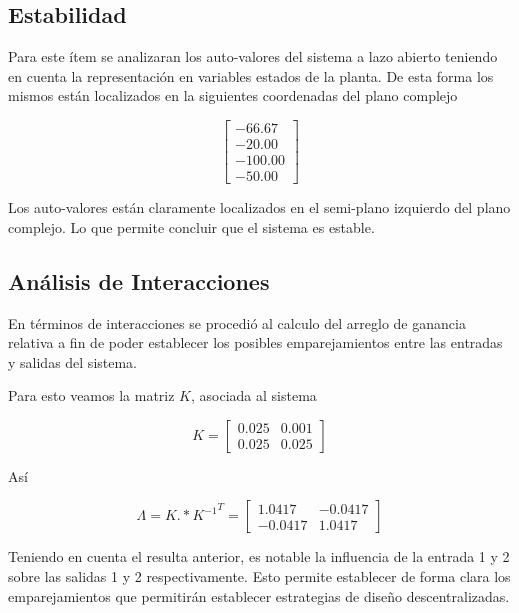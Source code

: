 \documentclass[journal,twoside,web]{ieeecolor}
\begin{document}
	\subsection{Estabilidad}
		
		Para este ítem se analizaran los auto-valores del sistema a lazo abierto teniendo en cuenta la representación en variables estados de la planta. De esta forma los mismos están localizados en la siguientes coordenadas del plano complejo
		
		\begin{equation}
			\begin{bmatrix}
				-66.67 \\
				-20.00 \\
				-100.00 \\
				-50.00
			\end{bmatrix}
		\end{equation}
		
		Los auto-valores están claramente localizados en el semi-plano izquierdo del plano complejo. Lo que permite concluir que el sistema es estable.
		
	\subsection{Análisis de Interacciones}
	
		En términos de interacciones se procedió al calculo del arreglo de ganancia relativa a fin de poder establecer los posibles emparejamientos entre las entradas y salidas del sistema.
		
		Para esto veamos la matriz $K$, asociada al sistema
		
		\begin{equation}
			K = \begin{bmatrix}
				0.025 & 0.001 \\
				0.025 & 0.025
			\end{bmatrix}
		\end{equation}
		
		Así
		
		\begin{equation}
		\label{rga}
			\varLambda = K .* {K^{-1}}^{T} = \begin{bmatrix}
												1.0417 & -0.0417 \\
												-0.0417 & 1.0417
											\end{bmatrix}
		\end{equation}
		
		Teniendo en cuenta el resulta anterior, es notable la influencia de la entrada 1 y 2 sobre las salidas 1 y 2 respectivamente. Esto permite establecer de forma clara los emparejamientos que permitirán establecer estrategias de diseño descentralizadas.
		
\end{document}
